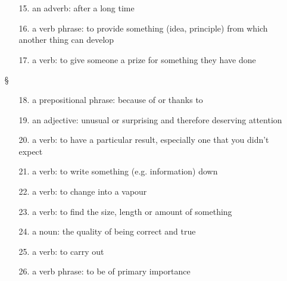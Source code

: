 \begin{enumerate}
            \begin{enumerate}
                  \item[15.] an adverb: after a long time
                  \item[16.] a verb phrase: to provide something (idea, principle) from
                        which another thing can develop
                  \item[17.] a verb: to give someone a prize for something they have
                        done
            \end{enumerate}
      \item[§] 
            \begin{enumerate}
                  \item[18.] a prepositional phrase: because of or thanks to
                  \item[19.] an adjective: unusual or surprising and therefore
                        deserving attention
                  \item[20.] a verb: to have a particular result, especially one that
                        you didn’t expect
                  \item[21.] a verb: to write something (e.g. information) down
                  \item[22.] a verb: to change into a vapour
                  \item[23.] a verb: to find the size, length or amount of something
                  \item[24.] a noun: the quality of being correct and true
                  \item[25.] a verb: to carry out
                  \item[26.] a verb phrase: to be of primary importance
            \end{enumerate}
\end{enumerate}

